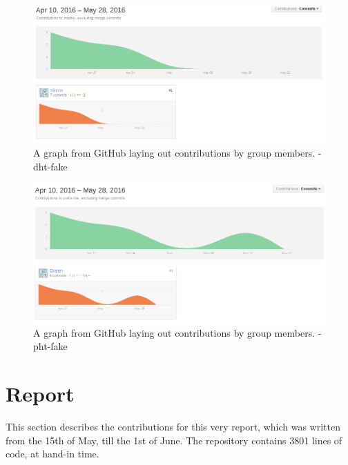 \begin{figure}[H]
  \centering
    \includegraphics[width=\linewidth]{gfx/dht-fake}
    \caption{A graph from GitHub laying out contributions by group members. - dht-fake}
  \label{fig:dht}
\end{figure}

\begin{figure}[H]
  \centering
    \includegraphics[width=\linewidth]{gfx/pht-fake}
    \caption{A graph from GitHub laying out contributions by group members. - pht-fake}
  \label{fig:pht}
\end{figure}

\section{Report}
This section describes the contributions for this very report, which was
written from the 15th of May, till the 1st of June.
\newline\newline
The repository contains 3801 lines of code, at hand-in time.

